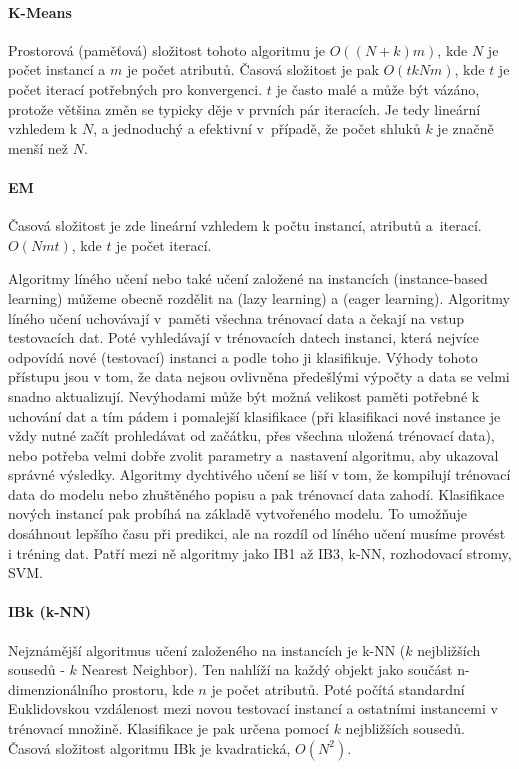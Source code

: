 \documentclass[12pt]{article}
\begin{document}
\paragraph{K-Means}
Prostorová (paměťová) složitost tohoto algoritmu je $O((N+k)m)$, kde $N$ je počet instancí a $m$ je počet atributů. Časová složitost je pak $O(tkNm)$, kde $t$ je počet iterací potřebných pro konvergenci. $t$ je často malé a může být vázáno, protože většina změn se typicky děje v prvních pár iteracích. Je tedy lineární vzhledem k $N$, a jednoduchý a efektivní v~případě, že počet shluků $k$ je značně menší než $N$.   
\paragraph{EM}
Časová složitost je zde lineární vzhledem k počtu instancí, atributů a~iterací. $O(Nmt)$, kde $t$ je počet iterací. \citep{uddin}

Algoritmy líného učení nebo také učení založené na instancích (instance-based learning) můžeme obecně rozdělit na  (lazy learning) a   (eager learning).  Algoritmy líného učení uchovávají v~paměti všechna trénovací data a čekají na vstup testovacích dat. Poté vyhledávají v trénovacích datech instanci, která nejvíce odpovídá nové (testovací) instanci a podle toho ji klasifikuje. Výhody tohoto přístupu jsou v tom, že data nejsou ovlivněna předešlými výpočty a data se velmi snadno aktualizují. Nevýhodami může být možná velikost paměti potřebné k uchování dat a tím pádem i pomalejší klasifikace (při klasifikaci nové instance je vždy nutné začít prohledávat od začátku, přes všechna uložená trénovací data), nebo potřeba velmi dobře zvolit parametry a~nastavení algoritmu, aby ukazoval správné výsledky.
\newline
\indent
Algoritmy dychtivého učení se liší v tom, že kompilují trénovací data do modelu nebo zhuštěného popisu a pak trénovací data zahodí. Klasifikace nových instancí pak probíhá na základě vytvořeného modelu. To umožňuje dosáhnout lepšího času při predikci, ale na rozdíl od líného učení musíme provést i tréning dat. Patří mezi ně algoritmy jako  IB1 až IB3, k-NN, rozhodovací stromy, SVM.
\paragraph{IBk (k-NN)}
Nejznámější algoritmus učení založeného na instancích je k-NN ($k$ nejbližších sousedů - $k$ Nearest Neighbor). Ten nahlíží na každý objekt jako součást n-dimenzionálního prostoru, kde $n$ je počet atributů. Poté počítá standardní Euklidovskou vzdálenost mezi novou testovací instancí a ostatními instancemi v trénovací množině. Klasifikace je pak určena pomocí $k$ nejbližších sousedů. 
\newline
\indent
Časová složitost algoritmu IBk je kvadratická,  $O(N^2)$. \citep{oniev}
\end{document}
